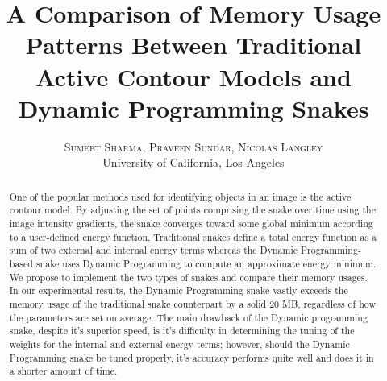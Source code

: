 \documentclass[twoside]{article}
\title{\vspace{-15mm}\fontsize{24pt}{10pt}\selectfont\textbf{A Comparison of Memory Usage Patterns Between Traditional Active Contour Models and Dynamic Programming Snakes}} %
\author{
\large
\textsc{Sumeet Sharma, Praveen Sundar, Nicolas Langley}\\[2mm] %
\normalsize University of California, Los Angeles \\ %
\vspace{-5mm}
}
\date{}
\begin{document}
\maketitle %

\thispagestyle{fancy} %


\begin{abstract}

\noindent 
One of the popular methods used for identifying objects in an image is the active contour model. By adjusting the set of points comprising the snake over time using the image intensity gradients, the snake converges toward some global minimum according to a user-defined energy function. Traditional snakes define a total energy function as a sum of two external and internal energy terms whereas the Dynamic Programming-based snake uses Dynamic Programming to compute an approximate energy minimum. We propose to implement the two types of snakes and compare their memory usages. In our experimental results, the Dynamic Programming snake vastly exceeds the memory usage of the traditional snake counterpart by a solid 20 MB, regardless of how the parameters are set on average. The main drawback of the Dynamic programming snake, despite it's superior speed, is it's difficulty in determining the tuning of the weights for the internal and external energy terms; however, should the Dynamic Programming snake be tuned properly, it's accuracy performs quite well and does it in a shorter amount of time. 

\end{abstract}

\end{document}
